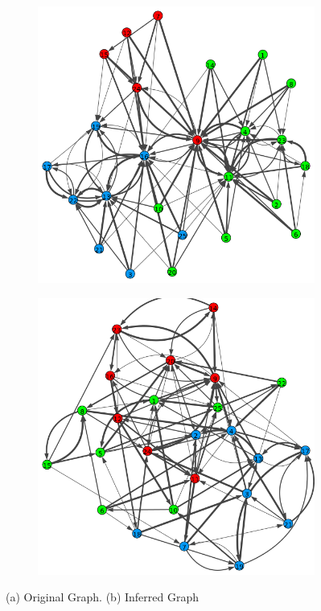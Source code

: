 \documentclass[12pt]{ociamthesis}  %
\begin{document}
	\begin{figure}[H]
		\centering
		\begin{subfigure}[b]{0.55\textwidth}
			\includegraphics[width=1\linewidth]{OriginalPlotFixedPrior}
			\caption{}
			\label{fig:Ng1} 
		\end{subfigure}
		
		\begin{subfigure}[b]{0.55\textwidth}
			\includegraphics[width=1\linewidth]{OptimizationPlotFixedPrior}
			\caption{}
			\label{fig:Ng2}
		\end{subfigure}
		
		\caption[Two graphs]{(a) Original Graph. (b) Inferred Graph}
	\end{figure}
\end{document}
